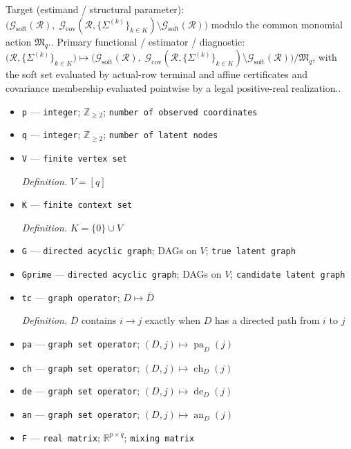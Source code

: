 \documentclass{article}
\begin{document}
Target (estimand / structural parameter): \(\bigl(\mathcal G_{\mathrm{soft}}(\mathcal R),\;\mathcal G_{\mathrm{cov}}(\mathcal R,\{\Sigma^{(k)}\}_{k\in K})\setminus\mathcal G_{\mathrm{soft}}(\mathcal R)\bigr)\) modulo the common monomial action \(\mathfrak M_q\)..
Primary functional / estimator / diagnostic: \(\bigl(\mathcal R,\{\Sigma^{(k)}\}_{k\in K}\bigr)\longmapsto\bigl(\mathcal G_{\mathrm{soft}}(\mathcal R),\;\mathcal G_{\mathrm{cov}}(\mathcal R,\{\Sigma^{(k)}\}_{k\in K})\setminus\mathcal G_{\mathrm{soft}}(\mathcal R)\bigr)/\mathfrak M_q\), with the soft set evaluated by actual-row terminal and affine certificates and covariance membership evaluated pointwise by a legal positive-real realization..
\begin{itemize}
  \item \texttt{p} --- \texttt{integer}; \(\mathbb{Z}_{\ge 2}\); \texttt{number of observed coordinates}
  \item \texttt{q} --- \texttt{integer}; \(\mathbb{Z}_{\ge 2}\); \texttt{number of latent nodes}
  \item \texttt{V} --- \texttt{finite vertex set}
  \par\smallskip\noindent\emph{Definition.} \(V=[q]\)
  \item \texttt{K} --- \texttt{finite context set}
  \par\smallskip\noindent\emph{Definition.} \(K=\{0\}\cup V\)
  \item \texttt{G} --- \texttt{directed acyclic graph}; DAGs on \(V\); \texttt{true latent graph}
  \item \texttt{Gprime} --- \texttt{directed acyclic graph}; DAGs on \(V\); \texttt{candidate latent graph}
  \item \texttt{tc} --- \texttt{graph operator}; \(D\mapsto\overline D\)
  \par\smallskip\noindent\emph{Definition.} \(\overline D\) contains \(i\to j\) exactly when \(D\) has a directed path from \(i\) to \(j\)
  \item \texttt{pa} --- \texttt{graph set operator}; \((D,j)\mapsto\operatorname{pa}_{D}(j)\)
  \item \texttt{ch} --- \texttt{graph set operator}; \((D,j)\mapsto\operatorname{ch}_{D}(j)\)
  \item \texttt{de} --- \texttt{graph set operator}; \((D,j)\mapsto\operatorname{de}_{D}(j)\)
  \item \texttt{an} --- \texttt{graph set operator}; \((D,j)\mapsto\operatorname{an}_{D}(j)\)
  \item \texttt{F} --- \texttt{real matrix}; \(\mathbb{R}^{p\times q}\); \texttt{mixing matrix}

\end{itemize}
\end{document}
